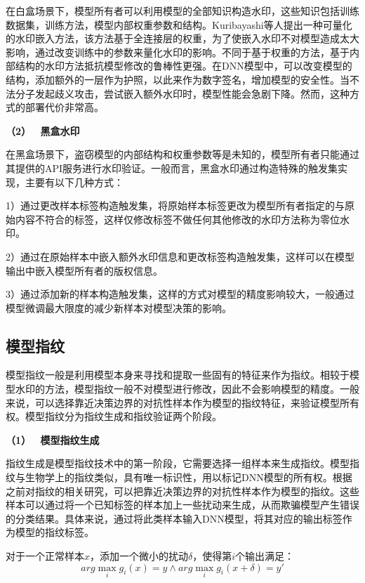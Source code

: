 在白盒场景下，模型所有者可以利用模型的全部知识构造水印，这些知识包括训练数据集，训练方法，模型内部权重参数和结构。Kuribayashi等人\cite{kuribayashi2020deepwatermark}提出一种可量化的水印嵌入方法，该方法基于全连接层的权重，为了使嵌入水印不对模型造成太大影响，通过改变训练中的参数来量化水印的影响。不同于基于权重的方法，基于内部结构的水印方法抵抗模型修改的鲁棒性更强。在DNN模型中，可以改变模型的结构，添加额外的一层作为护照\cite{fan2019rethinking}，以此来作为数字签名，增加模型的安全性。当不法分子发起歧义攻击，尝试嵌入额外水印时，模型性能会急剧下降。然而，这种方式的部署代价非常高。

\noindent\textbf{（2） \ 黑盒水印   }

在黑盒场景下，盗窃模型的内部结构和权重参数等是未知的，模型所有者只能通过其提供的API服务进行水印验证。一般而言，黑盒水印通过构造特殊的触发集实现，主要有以下几种方式：

1）通过更改样本标签构造触发集，将原始样本标签更改为模型所有者指定的与原始内容不符合的标签，这样仅修改标签不做任何其他修改的水印方法称为零位水印。

2）通过在原始样本中嵌入额外水印信息和更改标签构造触发集，这样可以在模型输出中嵌入模型所有者的版权信息。

3）通过添加新的样本构造触发集，这样的方式对模型的精度影响较大，一般通过模型微调最大限度的减少新样本对模型决策的影响。



\subsection{模型指纹}

模型指纹一般是利用模型本身来寻找和提取一些固有的特征来作为指纹。相较于模型水印的方法，模型指纹一般不对模型进行修改，因此不会影响模型的精度。一般来说，可以选择靠近决策边界的对抗性样本作为模型的指纹特征，来验证模型所有权。模型指纹分为指纹生成和指纹验证两个阶段。

\noindent\textbf{（1） \  模型指纹生成   }

指纹生成是模型指纹技术中的第一阶段，它需要选择一组样本来生成指纹。模型指纹与生物学上的指纹类似，具有唯一标识性，用以标记DNN模型的所有权。根据之前对指纹的相关研究\cite{zhao2020afa,lukas2019deep,cao2021ipguard}，可以把靠近决策边界的对抗性样本作为模型的指纹。这些样本可以通过将一个已知标签的样本加上一些扰动来生成，从而欺骗模型产生错误的分类结果。具体来说，通过将此类样本输入DNN模型，将其对应的输出标签作为模型的指纹标签。

对于一个正常样本$x$，添加一个微小的扰动$\delta$，使得第$i$个输出满足：
\begin{equation}
	\label{eq:4}
	arg \mathop{max} \limits_i g_i(x) = y \wedge arg \mathop{max} \limits_i g_i(x + \delta) = y'
\end{equation}

